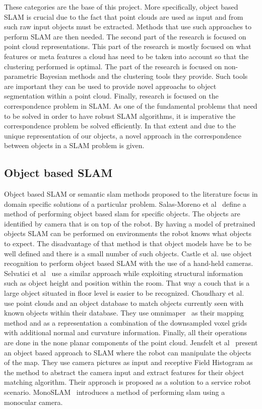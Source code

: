 \documentclass[twoside]{article}
\begin{document}
\begin{multicols}{2}
These categories are the base of this project. More specifically, object based SLAM is crucial due to the fact that point clouds are used as input and from such raw input objects must be extracted. Methods that use such approaches to perform SLAM are then needed. The second part of the research is focused on point cloud representations. This part of the research is mostly focused on what features or meta features a cloud has need to be taken into account so that the clustering performed is optimal. The part of the research is focused on non-parametric Bayesian methods and the clustering tools they provide. Such tools are important they can be used to provide novel approachs to object segmentation within a point cloud. Finally, research is focused on the correspondence problem in SLAM. As one of the fundamental problems that need to be solved in order to have robust SLAM algorithms, it is imperative the correspondence problem be solved efficiently. In that extent and due to the unique representation of our objects, a novel approach in the correspondence between objects in a SLAM problem is given.
\subsection{Object based SLAM}
Object based SLAM or semantic slam methods proposed to the literature focus in domain specific solutions of a particular problem. Salas-Moreno et al~\cite{slam++} define a method of performing object based slam for specific objects. The objects are identified by camera that is on top of the robot. By having a model of pretrained objects SLAM can be performed on environments the robot knows what objects to expect. The disadvantage of that method is that object models have be to be well defined and there is a small number of such objects. 
Castle et al. use object recognition to perform object based SLAM with the use of a hand-held cameras. Selvatici et al~\cite{objslam} use a similar approach while exploiting structural information such as object height and position within the room. That way a couch that is a large object situated in floor level is easier to be recognized.
Choudhary et al.~\cite{objectpointslam} use point clouds and an object database to match objects currently seen with known objects within their database. They use omnimaper~\cite{omnimaper} as their mapping method and as a representation a combination of the downsampled  voxel grids with additional normal and curvature information.  Finally, all their operations are done in the none planar components of the point cloud.
Jensfelt et al~\cite{objslam} present an object based approach to SLAM where the robot can manipulate the objects of the map. They use camera pictures as input and receptive Field Histogram as the method to abstract the camera input and extract features for their object matching algorithm. Their approach is proposed as a solution to a service robot scenario.
MonoSLAM~\cite{monoslam} introduces a method of performing slam using a monocular camera. 


\end{multicols}
\end{document}
